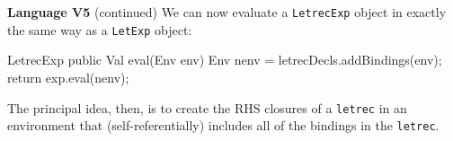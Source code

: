 \begin{minipage}[t]{\sw}
\slidenumber
\LARGE
{\bf Language V5} (continued)\exx
\emm\large{}\exx
\LARGE
We can now evaluate a \verb'LetrecExp' object
in exactly the same way as a \verb'LetExp' object:
\Large
\begin{qv}
LetrecExp
    public Val eval(Env env) {
        Env nenv = letrecDecls.addBindings(env);
        return exp.eval(nenv);
    }
\end{qv}
\LARGE
The principal idea, then,
is to create the RHS closures of a \verb'letrec'
in an environment that (self-referentially) includes all of the bindings
in the \verb'letrec'.
\end{minipage}
